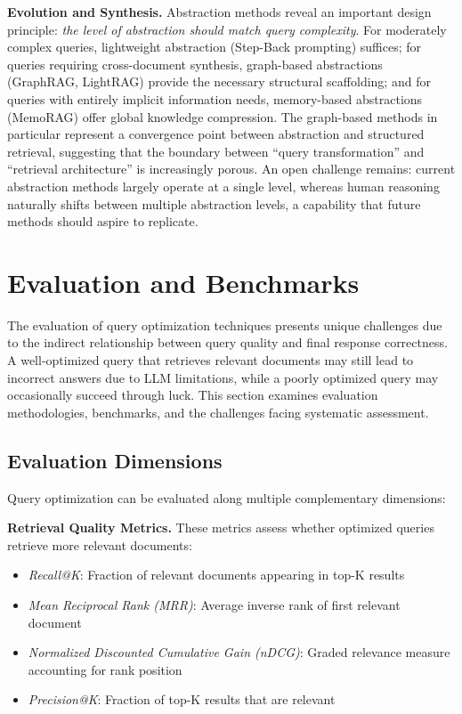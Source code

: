 \documentclass{article}
\begin{document}
\textbf{Evolution and Synthesis.} Abstraction methods reveal an important design principle: \textit{the level of abstraction should match query complexity}. For moderately complex queries, lightweight abstraction (Step-Back prompting) suffices; for queries requiring cross-document synthesis, graph-based abstractions (GraphRAG, LightRAG) provide the necessary structural scaffolding; and for queries with entirely implicit information needs, memory-based abstractions (MemoRAG) offer global knowledge compression. The graph-based methods in particular represent a convergence point between abstraction and structured retrieval, suggesting that the boundary between ``query transformation'' and ``retrieval architecture'' is increasingly porous. An open challenge remains: current abstraction methods largely operate at a single level, whereas human reasoning naturally shifts between multiple abstraction levels, a capability that future methods should aspire to replicate.

\section{Evaluation and Benchmarks}\label{sec:evaluation}

The evaluation of query optimization techniques presents unique challenges due to the indirect relationship between query quality and final response correctness. A well-optimized query that retrieves relevant documents may still lead to incorrect answers due to LLM limitations, while a poorly optimized query may occasionally succeed through luck. This section examines evaluation methodologies, benchmarks, and the challenges facing systematic assessment.

\subsection{Evaluation Dimensions}

Query optimization can be evaluated along multiple complementary dimensions:

\textbf{Retrieval Quality Metrics.} These metrics assess whether optimized queries retrieve more relevant documents:
\begin{itemize}[leftmargin=*,nosep]
    \item \textit{Recall@K}: Fraction of relevant documents appearing in top-K results
    \item \textit{Mean Reciprocal Rank (MRR)}: Average inverse rank of first relevant document
    \item \textit{Normalized Discounted Cumulative Gain (nDCG)}: Graded relevance measure accounting for rank position
    \item \textit{Precision@K}: Fraction of top-K results that are relevant
\end{itemize}
\end{document}
